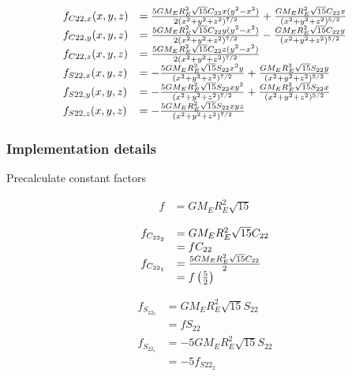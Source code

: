 \documentclass{article}
\begin{document}
\begin{equation}
\begin{array}{ll}
f_{C22,x}(x,y,z) &= {5GM_ER_E^2\sqrt{15}C_{22}x(y^2-x^2)\over 2(x^2+y^2+z^2)^{7/2}}+{GM_ER_E^2\sqrt{15}C_{22}x\over(x^2+y^2+z^2)^{5/2}} \\
f_{C22,y}(x,y,z) &= {5GM_ER_E^2\sqrt{15}C_{22}y(y^2-x^2)\over 2(x^2+y^2+z^2)^{7/2}}-{GM_ER_E^2\sqrt{15}C_{22}y\over(x^2+y^2+z^2)^{5/2}} \\
f_{C22,z}(x,y,z) &= {5GM_ER_E^2\sqrt{15}C_{22}z(y^2-x^2)\over 2(x^2+y^2+z^2)^{7/2}}\\
f_{S22,x}(x,y,z) &= -{5GM_ER_E^2\sqrt{15}S_{22}x^2y\over (x^2+y^2+z^2)^{7/2}}+{GM_ER_E^2\sqrt{15}S_{22}y\over(x^2+y^2+z^2)^{5/2}} \\
f_{S22,y}(x,y,z) &= -{5GM_ER_E^2\sqrt{15}S_{22}xy^2\over (x^2+y^2+z^2)^{7/2}}+{GM_ER_E^2\sqrt{15}S_{22}x\over(x^2+y^2+z^2)^{5/2}} \\
f_{S22,z}(x,y,z) &= -{5GM_ER_E^2\sqrt{15}S_{22}xyz\over (x^2+y^2+z^2)^{7/2}}
\end{array}
\end{equation}

\subsubsection{Implementation details}

Precalculate constant factors

\begin{equation}
\begin{array}{ll}
f &= {GM_ER_E^2\sqrt{15}}
\end{array}
\end{equation}

\begin{equation}
\begin{array}{ll}
f_{C_{22_2}} &= {GM_ER_E^2\sqrt{15}C_{22}} \\
             &= fC_{22} \\
f_{C_{22_1}} &= {{5GM_ER_E^2\sqrt{15}C_{22}} \over {2}} \\
             &= f\left( 5 \over 2\right)
\end{array}
\end{equation}

\begin{equation}
\begin{array}{ll}
f_{S_{22_2}} &= {GM_ER_E^2\sqrt{15}S_{22}} \\
             &= fS_{22} \\
f_{S_{22_1}} &= {-5GM_ER_E^2\sqrt{15}S_{22}} \\
             &= -5f_{S22_2}
\end{array}
\end{equation}
\end{document}
